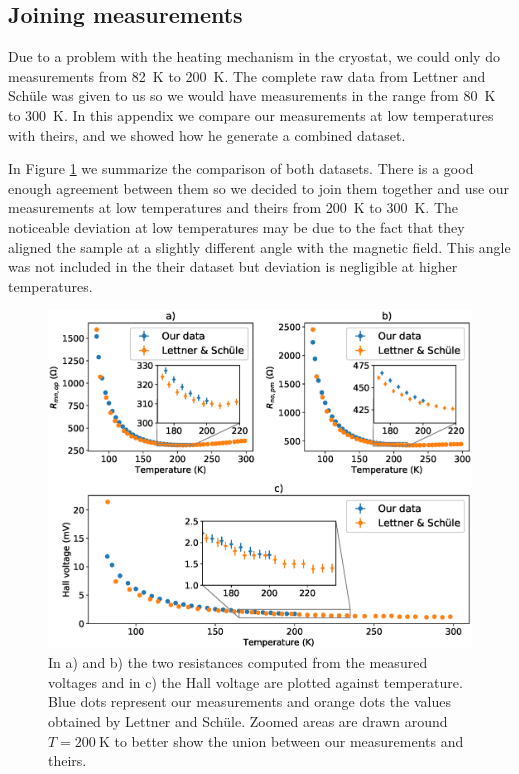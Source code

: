 \documentclass[11pt,a4paper]{article}
\begin{document}
\newpage
\begin{appendices}
\section{Joining measurements}\label{app:dataset}
Due to a problem with the heating mechanism in the cryostat, we could only do measurements from \SI{82}{\kelvin} to \SI{200}{\kelvin}. The complete raw data from Lettner and Schüle was given to us so we would have measurements in the range from \SI{80}{\kelvin} to \SI{300}{\kelvin}. In this appendix we compare our measurements at low temperatures with theirs, and we showed how he generate a combined dataset.

In Figure \ref{fig:comparison_datasets} we summarize the comparison of both datasets. There is a good enough agreement between them so we decided to join them together and use our measurements at low temperatures and theirs from \SI{200}{\kelvin} to \SI{300}{\kelvin}. The noticeable deviation at low temperatures may be due to the fact that they aligned the sample at a slightly different angle with the magnetic field. This angle was not included in the their dataset but deviation is negligible at higher temperatures.

\begin{figure}[H]
\centering
\includegraphics[width=\textwidth]{comparison_datasets.eps}
\caption{In a) and b) the two resistances computed from the measured voltages and in c) the Hall voltage are plotted against temperature. Blue dots represent our measurements and orange dots the values obtained by Lettner and Schüle. Zoomed areas are drawn around $T=\SI{200}{\kelvin}$ to better show the union between our measurements and theirs.}
\label{fig:comparison_datasets}
\end{figure}


\end{appendices}
\end{document}
